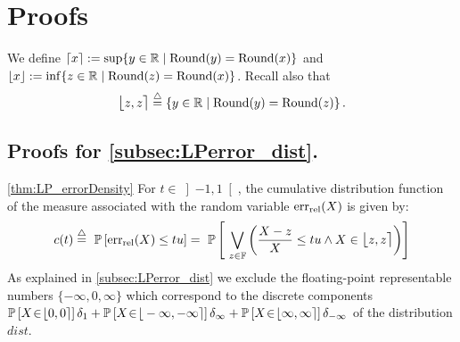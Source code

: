 
\appendix

\section{Proofs}
We define $\lceil x \rceil\mathrel{:=} \sup\{y\in\mathbb{R}\mid \mathrm{Round}(y)=\mathrm{Round}(x)\}$ and $\lfloor x \rfloor\mathrel{:=} \inf\{z\in\mathbb{R}\mid \mathrm{Round}(z)=\mathrm{Round}(x)\}$. Recall also that 
\[
\fintvl\stackrel{\triangle}{=}\left\{y\in\R\mid \round(y)=\round(z)\right\}.
\]

\subsection{Proofs for \cref{subsec:LPerror_dist}.}

\begin{myproof}{\cref{thm:LP_errorDensity}}
For $t\in\left]-1,1\right[$, the cumulative distribution function of the measure associated with the random variable $\mathrm{err}_{\mathrm{rel}}(X)$ is given by:
\begin{align*}
c(t)\stackrel{\triangle}{=}~\Pro{\erel(X)\leq t\uro}=~\Pro{~\bigvee_{z\in\F}\left(\frac{X-z}{X}\leq t\uro\wedge X\in \fintvl[z]\right)}
\end{align*}
As explained in \cref{subsec:LPerror_dist} we exclude the floating-point representable numbers $\{-\infty, 0, \infty\}$ which correspond to the discrete components $\Pro{X\ssvin\fintvl[0]}\delta_1 + \Pro{X\ssvin\fintvl[-\infty]}\delta_{\infty}\ \hspace{-3pt}+ \Pro{X\ssvin\fintvl[\infty]}\delta_{-\infty}$ of the distribution $dist$.


\end{myproof}
